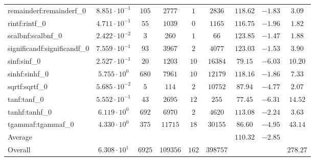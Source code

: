 \begin{tabular}{|l|c|c|c|c|c|c|c|c|}
remainderf:remainderf\_0     & $ 8.851 \cdot 10^{-1} $ & $ 105    $ & $ 2777   $ & $ 1   $ & $ 2836   $ & $ 118.62      $ & $ -1.83   $ & $ 3.09    $ \\
rintf:rintf\_0               & $ 4.711 \cdot 10^{-1} $ & $ 55     $ & $ 1039   $ & $ 0   $ & $ 1165   $ & $ 116.75      $ & $ -1.96   $ & $ 1.82    $ \\
scalbnf:scalbnf\_0           & $ 2.422 \cdot 10^{-2} $ & $ 3      $ & $ 260    $ & $ 1   $ & $ 66     $ & $ 123.85      $ & $ -1.47   $ & $ 1.88    $ \\
significandf:significandf\_0 & $ 7.559 \cdot 10^{-1} $ & $ 93     $ & $ 3967   $ & $ 2   $ & $ 4077   $ & $ 123.03      $ & $ -1.53   $ & $ 3.90    $ \\
sinf:sinf\_0                 & $ 2.527 \cdot 10^{-1} $ & $ 20     $ & $ 1203   $ & $ 10  $ & $ 16384  $ & $ 79.15       $ & $ -6.03   $ & $ 10.20   $ \\
sinhf:sinhf\_0               & $ 5.755 \cdot 10^{0}  $ & $ 680    $ & $ 7961   $ & $ 10  $ & $ 12179  $ & $ 118.16      $ & $ -1.86   $ & $ 7.33    $ \\
sqrtf:sqrtf\_0               & $ 5.685 \cdot 10^{-2} $ & $ 5      $ & $ 114    $ & $ 2   $ & $ 10752  $ & $ 87.94       $ & $ -4.77   $ & $ 2.07    $ \\
tanf:tanf\_0                 & $ 5.552 \cdot 10^{-1} $ & $ 43     $ & $ 2695   $ & $ 12  $ & $ 255    $ & $ 77.45       $ & $ -6.31   $ & $ 14.52   $ \\
tanhf:tanhf\_0               & $ 6.119 \cdot 10^{0}  $ & $ 692    $ & $ 6970   $ & $ 2   $ & $ 4620   $ & $ 113.08      $ & $ -2.24   $ & $ 3.63    $ \\
tgammaf:tgammaf\_0           & $ 4.330 \cdot 10^{0}  $ & $ 375    $ & $ 11715  $ & $ 18  $ & $ 30155  $ & $ 86.60       $ & $ -4.95   $ & $ 43.14   $ \\
\hline
Average                      & $                     $ & $        $ & $        $ & $     $ & $        $ & $ 110.32      $ & $ -2.85   $ & $         $ \\
\hline
Overall                      & $ 6.308 \cdot 10^{1}  $ & $ 6925   $ & $ 109356 $ & $ 162 $ & $ 398757 $ & $             $ & $         $ & $ 278.27  $ \\
\hline
\end{tabular}
